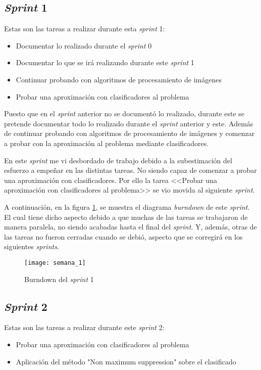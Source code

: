 \subsection{\textit{Sprint} 1}
Estas son las tareas a realizar durante esta \textit{sprint} 1:

\begin{itemize}
	\item Documentar lo realizado durante el \textit{sprint} 0
	\item Documentar lo que se irá realizando durante este \textit{sprint} 1
	\item Continuar probando con algoritmos de procesamiento de imágenes
	\item Probar una aproximación con clasificadores al problema
\end{itemize}

Puesto que en el \textit{sprint} anterior no se documentó lo realizado, durante este se pretende documentar todo lo realizado durante el \textit{sprint} anterior y este. Además de continuar probando con algoritmos de procesamiento de imágenes y comenzar a probar con la aproximación al problema mediante clasificadores.

En este \textit{sprint} me vi desbordado de trabajo debido a la subestimación del esfuerzo a empeñar en las distintas tareas. No siendo capaz de comenzar a probar una aproximación con clasificadores. Por ello la tarea <<Probar una aproximación con clasificadores al problema>> se vio movida al siguiente \textit{sprint}. 

A continuación, en la figura \ref{fig:A.1.2}, se muestra el diagrama \textit{burndown} de este \textit{sprint}. El cual tiene dicho aspecto debido a que muchas de las tareas se trabajaron de manera paralela, no siendo acabadas hasta el final del \textit{sprint}. Y, además, otras de las tareas no fueron cerradas cuando se debió, aspecto que se corregirá en los siguientes \textit{sprints}.

\begin{figure}[h]
\centering
\texttt{[image: semana\_1]}
\caption{Burndown del \textit{sprint} 1}
\label{fig:A.1.2}
\end{figure}

\subsection{\textit{Sprint} 2}
Estas son las tareas a realizar durante este \textit{sprint} 2:

\begin{itemize}
	\item Probar una aproximación con clasificadores al problema
	\item Aplicación del método "Non maximum suppression" sobre el clasificado
\end{itemize}

